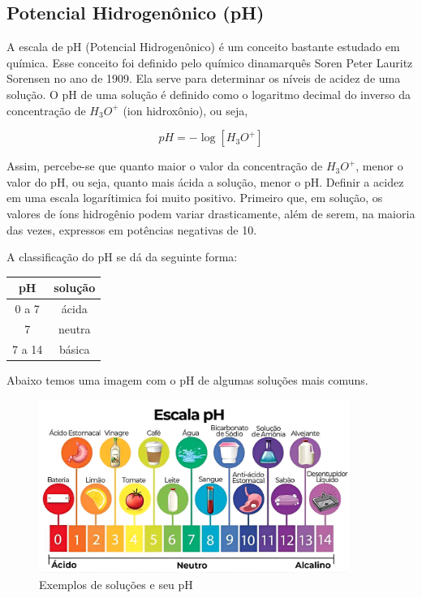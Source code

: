 \subsection{Potencial Hidrogenônico (pH)}

A escala de pH (Potencial Hidrogenônico) é um conceito bastante estudado em química. Esse conceito foi definido pelo químico dinamarquês Soren Peter Lauritz Sorensen no ano de 1909. Ela serve para determinar os níveis de acidez de uma solução. O pH de uma solução é definido como o logaritmo decimal do inverso da concentração de $H_3O^{+}$ (ion hidroxônio), ou seja,

\[
pH = - \log[H_3O^{+}]
\]

Assim, percebe-se que quanto maior o valor da concentração de $H_3O^{+}$, menor o valor do pH, ou seja, quanto mais ácida a solução, menor o pH. Definir a acidez em uma escala logarítimica foi muito positivo. Primeiro que, em solução, os valores de íons hidrogênio podem variar drasticamente, além de serem, na maioria das vezes, expressos em potências negativas de 10.


A classificação do pH se dá da seguinte forma:

\begin{center}
\begin{tabular}{|c|c|}
\hline
\textbf{pH} & \textbf{solução} \\
\hline
0 a 7 & ácida \\
\hline
7 & neutra \\
\hline
7 a 14 & básica \\
\hline
\end{tabular}
\end{center}

Abaixo temos uma imagem com o pH de algumas soluções mais comuns.

\begin{figure}[h]
    \centering
    \includegraphics[width=0.9\textwidth]{img/escalaph.png}
    \caption{Exemplos de soluções e seu pH}
    \label{fig:escalaph}
\end{figure}


